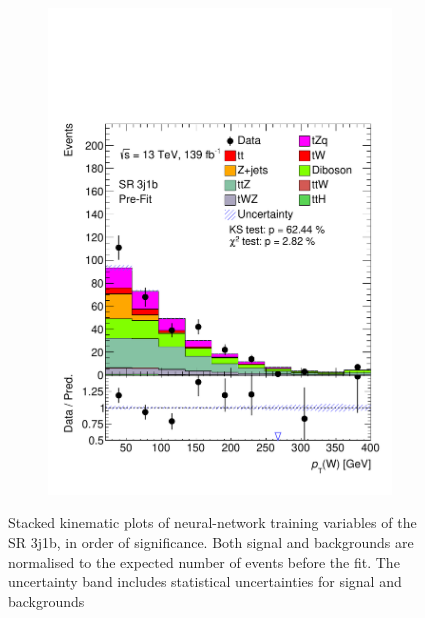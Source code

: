 \begin{figure}[!h]
\begin{subfigure}[b]{0.32\linewidth}
    \includegraphics[width=\linewidth]{ubonn-thesis/Chapters/Chapters_06/Figure/Input_distribution/SR_3j1b_W_pt.pdf} 
  \end{subfigure}%
  \caption{Stacked kinematic plots of neural-network training variables of the SR 3j1b, in order of significance. Both signal and backgrounds are normalised to the expected number of events before the fit. The uncertainty band includes statistical uncertainties for signal and backgrounds}
  \label{fig_signal3}
  \end{figure}


